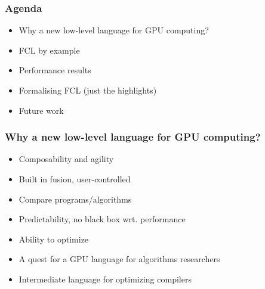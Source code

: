 \documentclass{beamer}
\begin{document}
\begin{frame}[fragile]
  \frametitle{Agenda}

\begin{itemize}
\item Why a new low-level language for GPU computing?
\item FCL by example
\item Performance results
\item Formalising FCL (just the highlights)
\item Future work
\end{itemize}
\end{frame}

\begin{frame}
\frametitle{Why a new low-level language for GPU computing?}
\begin{itemize}
\item Composability and agility
\item Built in fusion, user-controlled
\item Compare programs/algorithms
\item Predictability, no black box wrt. performance
\item Ability to optimize
\item A quest for a GPU language for algorithms researchers
\item Intermediate language for optimizing compilers
\end{itemize}
\end{frame}
\end{document}
